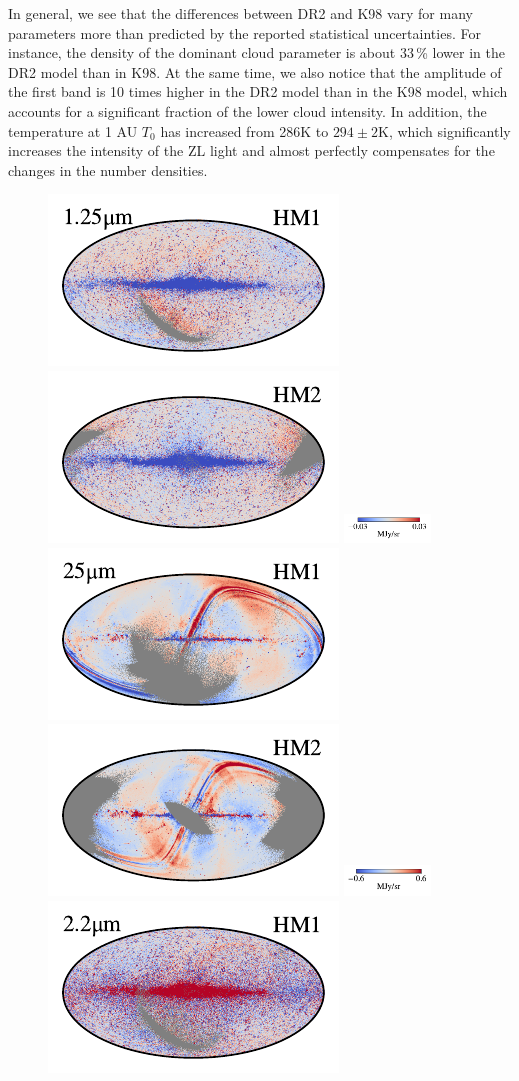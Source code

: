 \documentclass[twocolumn]{aa}
\begin{document}
In general, we see that the differences between DR2 and K98 vary for
many parameters more than predicted by the reported statistical
uncertainties. For instance, the density of the dominant cloud
parameter is about 33\,\% lower in the DR2 model than in K98. At the 
same time, we also notice that the amplitude of the first band is 10 times
higher in the DR2 model than in the K98 model, which accounts for a
significant fraction of the lower cloud intensity. In addition, the 
temperature at 1 AU $T_0$ has increased from 286K to $294 \pm 2$K, 
which significantly increases the intensity of the ZL light and almost 
perfectly compensates for the changes in the number densities.

\begin{figure}[t]
    \centering
    \includegraphics[width=0.22\linewidth]{figs/compare_res/cosmoglobe_res_01a.pdf}%
    \includegraphics[width=0.22\linewidth]{figs/compare_res/cosmoglobe_res_01b.pdf}%
    \includegraphics[width=23mm,angle=90]{figs/compare_res/cbar_01.pdf}\hspace*{3mm}
    \includegraphics[width=0.22\linewidth]{figs/compare_res/cosmoglobe_res_06a.pdf}%
    \includegraphics[width=0.22\linewidth]{figs/compare_res/cosmoglobe_res_06b.pdf}%
    \includegraphics[width=23mm,angle=90]{figs/compare_res/cbar_06.pdf}\\
    \includegraphics[width=0.22\linewidth]{figs/compare_res/cosmoglobe_res_02a.pdf}%

\end{figure}
\end{document}
